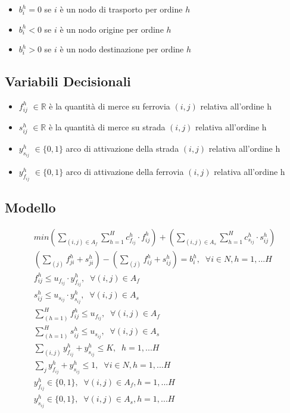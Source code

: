 \documentclass{article}
\begin{document}
\begin{itemize}
    \item $b_i^h = 0$ se $i$ è un nodo di trasporto per ordine $h$
    \item  $b_i^h <0$ se $i$ è un nodo origine per ordine $h$
    \item $b_i^h >0$ se $i$ è un nodo destinazione per ordine $h$
\end{itemize}

\subsection{Variabili Decisionali}
\begin{itemize}
    \item $f_{ij}^h$ $\in \mathbb{R}$  è la quantità di merce su ferrovia $(i,j)$ relativa all'ordine h 
    \item $s_{ij}^h$ $\in \mathbb{R}$ è la quantità di merce su strada $(i,j)$ relativa all'ordine h
    \item $y_{s_{ij}}^h$ $\in \{0,1\}$ arco di attivazione della strada $(i,j)$ relativa all'ordine h
    \item $y_{f_{ij}}^h$ $\in \{0,1\}$ arco di attivazione della ferrovia $(i,j)$ relativa all'ordine h
\end{itemize}

\subsection{Modello}

\label{problem1}
\begin{align}
    min (\sum_{(i,j) \in A_f}\sum_{h=1}^H c_{f_{ij}}^h \cdot f_{ij}^h) +
    (\sum_{(i,j) \in A_s}\sum_{h=1}^H c_{s_{ij}}^h \cdot s_{ij}^h)
    \label{mod:obj}
    \\
    (\sum_{(j)}f_{ji}^h + s_{ji}^h)- (\sum_{(j)}f_{ij}^h + s_{ij}^h) = b_i^h, \; \; \forall i \in N, h=1, ... H 
    \label{mod:v2}
    \\
    f_{ij}^h \leq u_{f_{ij}} \cdot y_{f_{ij}}^h, \; \; \forall (i,j) \in A_f
    \label{mod:v3}
    \\
    s_{ij}^h \leq u_{s_{ij}} \cdot y_{s_{ij}}^h, \; \; \forall (i,j) \in A_s
    \label{mod:v4}
    \\
    \sum_{(h=1)}^H f_{ij}^h \leq u_{f_{ij}}, \; \; \forall (i,j) \in A_f
    \label{mod:v5}
    \\
    \sum_{(h=1)}^H s_{ij}^h \leq u_{s_{ij}}, \; \; \forall (i,j) \in A_s
    \label{mod:v6}
    \\
    \sum_{(i,j)} y_{f_{ij}}^h + y_{s_{ij}}^h \leq K, \; \; h=1, ... H
    \label{mod:v7}
    \\
    \sum_{j} y_{f_{ij}}^h + y_{s_{ij}}^h \leq 1, \; \; \forall i \in \textit{N} , h=1, ... H
    \label{mod:v8}
    \\
    y_{f_{ij}}^h \in \{0,1\}, \; \; \forall (i,j) \in A_f, h=1, ... H
    \label{mod:v9}
    \\
    y_{s_{ij}}^h \in \{0,1\}, \; \; \forall (i,j) \in A_s, h=1, ... H
    \label{mod:v10}
\end{align}
\end{document}
